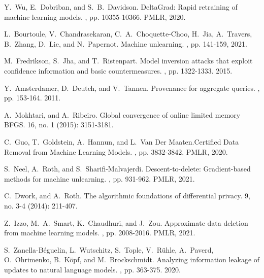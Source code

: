 \documentclass[11pt]{article}
\begin{document}
\begin{thebibliography}{10}
\begin{small}
 Y.~Wu, E.~Dobriban, and S.~B.~Davidson. \newblock DeltaGrad: Rapid retraining of machine learning models. , pp. 10355-10366. PMLR, 2020.

 L.~Bourtoule, V.~Chandrasekaran, C.~A.~Choquette-Choo, H.~Jia, A.~Travers, B.~Zhang, D.~Lie, and N.~Papernot. \newblock Machine unlearning. , pp. 141-159, 2021.

 M.~Fredrikson, S.~Jha, and T.~Ristenpart. \newblock Model inversion attacks that exploit confidence information and basic countermeasures. , pp. 1322-1333. 2015.

 Y.~Amsterdamer, D.~Deutch, and V.~Tannen. \newblock Provenance for aggregate queries. , pp. 153-164. 2011.

 A.~Mokhtari, and A.~Ribeiro. \newblock Global convergence of online limited memory BFGS.  16, no. 1 (2015): 3151-3181.

 C.~Guo, T.~Goldstein, A.~Hannun, and L.~Van Der Maaten.\newblock Certified Data Removal from Machine Learning Models. , pp. 3832-3842. PMLR, 2020.


 S.~Neel, A.~Roth, and S.~Sharifi-Malvajerdi. \newblock Descent-to-delete: Gradient-based methods for machine unlearning. , pp. 931-962. PMLR, 2021.

 C.~Dwork, and A.~Roth. \newblock The algorithmic foundations of differential privacy.  9, no. 3-4 (2014): 211-407.

 Z.~Izzo, M.~A.~Smart, K.~Chaudhuri, and J.~Zou. \newblock Approximate data deletion from machine learning models. , pp. 2008-2016. PMLR, 2021.

 S.~Zanella-Béguelin, L.~Wutschitz, S.~Tople, V.~Rühle, A.~Paverd, O.~Ohrimenko, B.~Köpf, and M.~Brockschmidt. \newblock Analyzing information leakage of updates to natural language models. , pp. 363-375. 2020.


\end{small}
\end{thebibliography}
\end{document}
